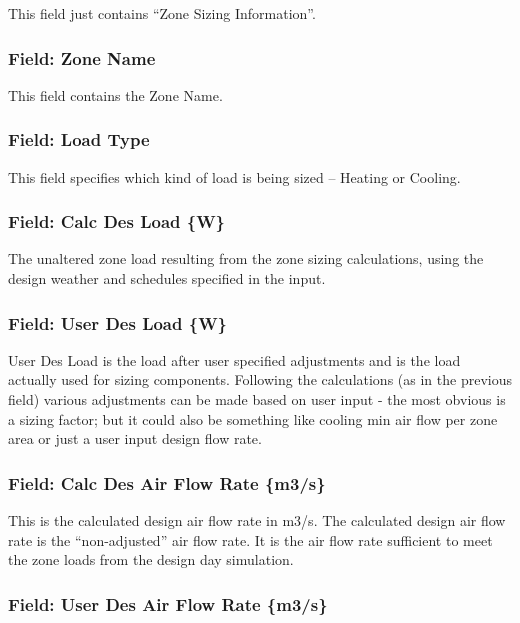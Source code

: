 This field just contains ``Zone Sizing Information''.

\subsubsection{Field: Zone Name}\label{field-zone-name-11}

This field contains the Zone Name.

\subsubsection{Field: Load Type}\label{field-load-type}

This field specifies which kind of load is being sized -- Heating or Cooling.

\subsubsection{Field: Calc Des Load \{W\}}\label{field-calc-des-load-w}

The unaltered zone load resulting from the zone sizing calculations, using the design weather and schedules specified in the input.

\subsubsection{Field: User Des Load \{W\}}\label{field-user-des-load-w}

User Des Load is the load after user specified adjustments and is the load actually used for sizing components. Following the calculations (as in the previous field) various adjustments can be made based on user input - the most obvious is a sizing factor; but it could also be something like cooling min air flow per zone area or just a user input design flow rate.

\subsubsection{Field: Calc Des Air Flow Rate \{m3/s\}}\label{field-calc-des-air-flow-rate-m3s}

This is the calculated design air flow rate in m3/s. The calculated design air flow rate is the ``non-adjusted'' air flow rate. It is the air flow rate sufficient to meet the zone loads from the design day simulation.

\subsubsection{Field: User Des Air Flow Rate \{m3/s\}}\label{field-user-des-air-flow-rate-m3s}

